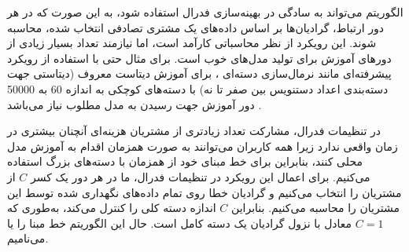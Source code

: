 الگوریتم
می‌تواند به سادگی در بهینه‌سازی فدرال استفاده شود، به این صورت که در هر دور ارتباط، گرادیان‌ها بر اساس داده‌های یک مشتری تصادفی انتخاب شده، محاسبه ‌شوند. این رویکرد از نظر محاسباتی کارآمد است، اما نیازمند تعداد بسیار زیادی از دورهای آموزش برای تولید مدل‌های خوب است.
برای مثال حتی با استفاده از رویکرد پیشرفته‌ای مانند نرمال‌سازی دسته‌ای%
%
، برای آموزش دیتاست معروف
(دیتاستی جهت دسته‌بندی اعداد دستنویس بین صفر تا نه)
با دسته‌های کوچکی به اندازه 60 به 50000 دور آموزش جهت رسیدن به مدل مطلوب نیاز می‌باشد
\cite{ioffe2015batch}.

در تنظیمات فدرال، مشارکت تعداد زیادتری از مشتریان هزینه‌ای آنچنان بیشتری در زمان واقعی ندارد زیرا همه کاربران می‌توانند به صورت همزمان اقدام به آموزش مدل محلی کنند، بنابراین برای خط مبنای خود از
همزمان با دسته‌های بزرگ استفاده می‌کنیم. برای اعمال این رویکرد در تنظیمات فدرال، ما در هر دور یک کسر
$C$
از مشتریان را انتخاب می‌کنیم و گرادیان خطا روی تمام داده‌های نگهداری شده توسط این مشتریان را محاسبه می‌کنیم. بنابراین
$C$
اندازه دسته‌ کلی را کنترل می‌کند، به‌طوری که
$C = 1$
معادل با نزول گرادیان یک دسته کامل است. حال این الگوریتم خط مبنا را
یا
می‌نامیم.

% 



